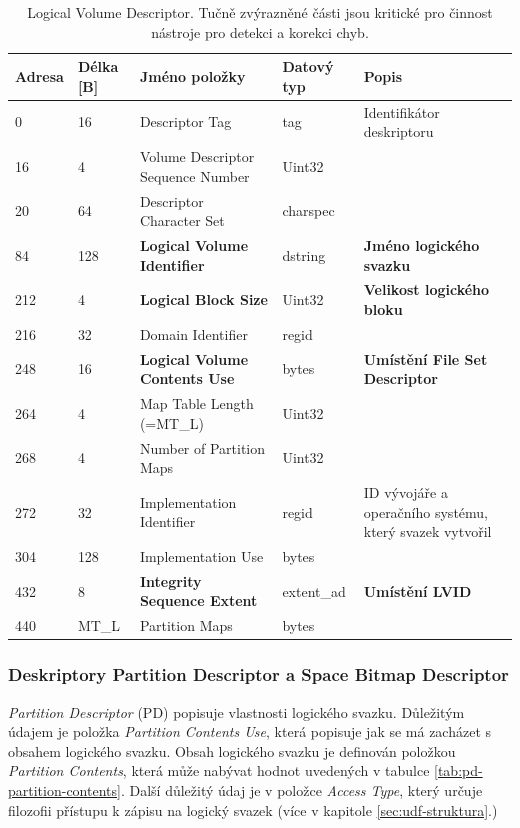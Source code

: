 \begin{table}[]
    \centering
    \begin{tabular}{ | l | l | p{4.2cm} | p{1.8cm} | p{5.5cm} | }
        \hline
        Adresa  & Délka [B]   & Jméno položky & Datový typ    & Popis \\ \hline\hline
        0   &16     & Descriptor Tag                    & tag           & Identifikátor deskriptoru \\ \hline
        16  &4      & Volume Descriptor Sequence Number & Uint32        &  \\ \hline
        20  &64     & Descriptor Character Set          & charspec      &  \\ \hline
        84  &128    & \textbf{Logical Volume Identifier}& dstring       & \textbf{Jméno logického svazku} \\ \hline
        212 &4      &\textbf{Logical Block Size}        & Uint32        & \textbf{Velikost logického bloku} \\ \hline
        216 &32     &Domain Identifier                  & regid         &  \\ \hline
        248 &16     &\textbf{Logical Volume Contents Use}& bytes         & \textbf{Umístění \textbf{File Set Descriptor}}\\ \hline
        264 &4      &Map Table Length (=MT\_L)          & Uint32        & \\ \hline
        268 &4      &Number of Partition Maps           & Uint32        & \\ \hline
        272 &32     &Implementation Identifier          & regid         & ID vývojáře a operačního systému, který svazek vytvořil \\ \hline
        304 &128    &Implementation Use                 & bytes         & \\ \hline
        432 &8      &\textbf{Integrity Sequence Extent} & extent\_ad    & \textbf{Umístění LVID} \\ \hline
        440 &MT\_L  &Partition Maps                     & bytes         & \\ \hline
    \end{tabular}
    \caption{Logical Volume Descriptor. Tučně zvýrazněné části jsou kritické pro činnost nástroje pro detekci a korekci chyb.\label{tab:lvd}}
\end{table}

\subsubsection{Deskriptory Partition Descriptor a Space Bitmap Descriptor}
\label{subsec:pd-sbd}
\textit{Partition Descriptor} (PD) popisuje vlastnosti logického svazku. Důležitým údajem je položka \textit{Partition Contents Use}, která popisuje jak se má zacházet s obsahem logického svazku. Obsah logického svazku je definován položkou \textit{Partition Contents}, která může nabývat hodnot uvedených v tabulce \ref{tab:pd-partition-contents}. Další důležitý údaj je v položce \textit{Access Type}, který určuje filozofii přístupu k zápisu na logický svazek (více v kapitole \ref{sec:udf-struktura}.)

